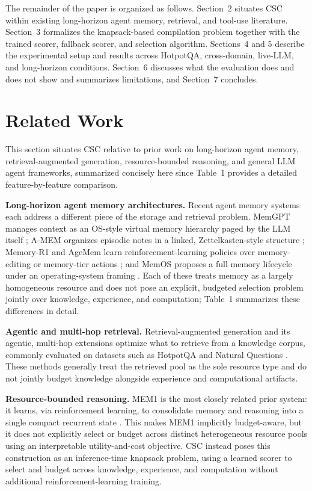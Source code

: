 \documentclass{article}
\begin{document}
The remainder of the paper is organized as follows. Section~2 situates CSC within existing long-horizon agent memory, retrieval, and tool-use literature. Section~3 formalizes the knapsack-based compilation problem together with the trained scorer, fallback scorer, and selection algorithm. Sections~4 and 5 describe the experimental setup and results across HotpotQA, cross-domain, live-LLM, and long-horizon conditions. Section~6 discusses what the evaluation does and does not show and summarizes limitations, and Section~7 concludes.

\section{Related Work}

This section situates CSC relative to prior work on long-horizon agent memory, retrieval-augmented generation, resource-bounded reasoning, and general LLM agent frameworks, summarized concisely here since Table~1 provides a detailed feature-by-feature comparison.

\textbf{Long-horizon agent memory architectures.} Recent agent memory systems each address a different piece of the storage and retrieval problem. MemGPT manages context as an OS-style virtual memory hierarchy paged by the LLM itself \citep{packer2023memgpt}; A-MEM organizes episodic notes in a linked, Zettelkasten-style structure \citep{xu2025amem}; Memory-R1 and AgeMem learn reinforcement-learning policies over memory-editing or memory-tier actions \citep{yan2025memoryr1, yu2026agemem}; and MemOS proposes a full memory lifecycle under an operating-system framing \citep{li2025memos}. Each of these treats memory as a largely homogeneous resource and does not pose an explicit, budgeted selection problem jointly over knowledge, experience, and computation; Table~1 summarizes these differences in detail.

\textbf{Agentic and multi-hop retrieval.} Retrieval-augmented generation \citep{lewis2020rag} and its agentic, multi-hop extensions optimize what to retrieve from a knowledge corpus, commonly evaluated on datasets such as HotpotQA \citep{yang2018hotpotqa} and Natural Questions \citep{kwiatkowski2019naturalquestions}. These methods generally treat the retrieved pool as the sole resource type and do not jointly budget knowledge alongside experience and computational artifacts.

\textbf{Resource-bounded reasoning.} MEM1 is the most closely related prior system: it learns, via reinforcement learning, to consolidate memory and reasoning into a single compact recurrent state \citep{zhou2025mem1}. This makes MEM1 implicitly budget-aware, but it does not explicitly select or budget across distinct heterogeneous resource pools using an interpretable utility-and-cost objective. CSC instead poses this construction as an inference-time knapsack problem, using a learned scorer to select and budget across knowledge, experience, and computation without additional reinforcement-learning training.
\end{document}
